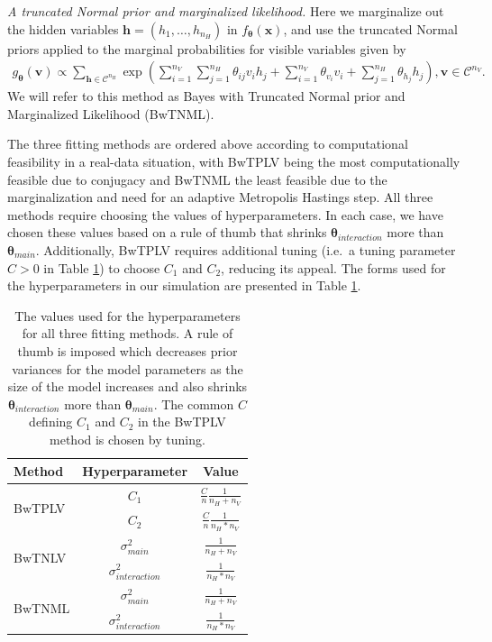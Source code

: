 \documentclass[]{article}
\theoremstyle{definition}
\newcommand{\nv}{{n_{\scriptscriptstyle V}}}
\newcommand{\nh}{{n_{\scriptscriptstyle H}}}
\begin{document}
\begin{enumerate}
  \emph{A truncated Normal prior and marginalized likelihood.} Here we
  marginalize out the hidden variables
  \(\boldsymbol h = (h_1, \dots, h_\nh)\) in
  \(f_{\boldsymbol \theta}(\boldsymbol x)\), and use the truncated
  Normal priors applied to the marginal probabilities for visible
  variables given by \begin{align*}
   g_{\boldsymbol \theta}(\boldsymbol v) \propto \sum\limits_{\boldsymbol h \in \mathcal{C}^\nh} \exp\left(\sum\limits_{i = 1}^\nv \sum\limits_{j=1}^\nh \theta_{ij} v_i h_j + \sum\limits_{i = 1}^\nv\theta_{v_i} v_i + \sum\limits_{j = 1}^\nh\theta_{h_j} h_j\right), \boldsymbol v \in \mathcal{C}^\nv.
   \end{align*} We will refer to this method as Bayes with Truncated
  Normal prior and Marginalized Likelihood (BwTNML).
\end{enumerate}
The three fitting methods are ordered above according to computational
feasibility in a real-data situation, with BwTPLV being the most
computationally feasible due to conjugacy and BwTNML the least feasible
due to the marginalization and need for an adaptive Metropolis Hastings
step. All three methods require choosing the values of hyperparameters.
In each case, we have chosen these values based on a rule of thumb that
shrinks \(\boldsymbol \theta_{interaction}\) more than
\(\boldsymbol \theta_{main}\). Additionally, BwTPLV requires additional
tuning (i.e.~a tuning parameter \(C > 0\) in Table \ref{tab:hyperparam})
to choose \(C_1\) and \(C_2\), reducing its appeal. The forms used for
the hyperparameters in our simulation are presented in Table
\ref{tab:hyperparam}.
\begin{table}[ht]
\centering
\begin{tabular}{|l|c|c|}
\hline 
Method & Hyperparameter & Value \\ 
\hline \hline
\multirow{2}{*}{BwTPLV} & $C_1$ & $\frac{C}{n}\frac{1}{\nh + \nv}$ \\
 & $C_2$ & $\frac{C}{n}\frac{1}{\nh*\nv}$ \\
\hline
\multirow{2}{*}{BwTNLV} & $\sigma^2_{main}$ & $\frac{1}{\nh + \nv}$ \\
 & $\sigma^2_{interaction}$ & $\frac{1}{\nh*\nv}$ \\
\hline
\multirow{2}{*}{BwTNML} & $\sigma^2_{main}$ & $\frac{1}{\nh + \nv}$ \\
 & $\sigma^2_{interaction}$ & $\frac{1}{\nh*\nv}$ \\
\hline
\end{tabular}
\caption{The values used for the hyperparameters for all three fitting methods. A rule of thumb is imposed which decreases prior variances for the model parameters as the size of the model increases and also shrinks $\boldsymbol \theta_{interaction}$ more than $\boldsymbol \theta_{main}$. The common $C$ defining $C_1$ and $C_2$  in the BwTPLV method is chosen by tuning.}
\label{tab:hyperparam}
\end{table}
\end{document}
